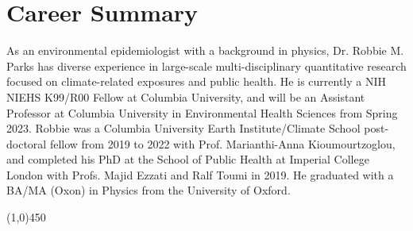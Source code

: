 \section*{Career Summary}

As an environmental epidemiologist with a background in physics, Dr. Robbie M. Parks has diverse experience in large-scale multi-disciplinary quantitative research focused on climate-related exposures and public health. He is currently a NIH NIEHS K99/R00 Fellow at Columbia University, and will be an Assistant Professor at Columbia University in Environmental Health Sciences from Spring 2023. Robbie was a Columbia University Earth Institute/Climate School post-doctoral fellow from 2019 to 2022 with Prof. Marianthi-Anna Kioumourtzoglou, and completed his PhD at the School of Public Health at Imperial College London with Profs. Majid Ezzati and Ralf Toumi in 2019. He graduated with a BA/MA (Oxon) in Physics from the University of Oxford. \medskip



\begin{center} \line(1,0){450} \end{center}